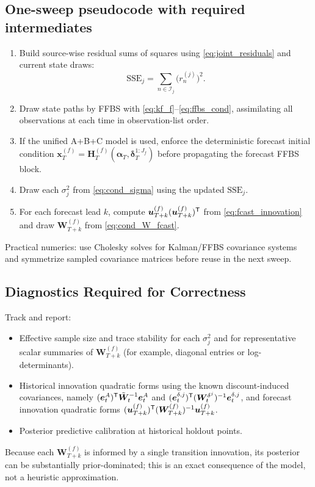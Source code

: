 \subsection{One-sweep pseudocode with required intermediates}
\begin{enumerate}[label=\textbf{P\arabic*:},leftmargin=2.0cm]
\item Build source-wise residual sums of squares using \eqref{eq:joint_residuals}
and current state draws:
\[
\mathrm{SSE}_j=\sum_{n\in\mathcal{I}_j}\big(r_n^{(j)}\big)^2.
\]
\item Draw state paths by FFBS with \eqref{eq:kf_f}--\eqref{eq:ffbs_cond},
assimilating all observations at each time in observation-list order.
\item If the unified A+B+C model is used, enforce the deterministic forecast initial condition
$\bm x_T^{(f)}=\bm H_T^{(f)}(\bm\alpha_T,\bm\delta_T^{1:J_f})$ before propagating the forecast FFBS
block.
\item Draw each $\sigma_j^2$ from \eqref{eq:cond_sigma} using the updated $\mathrm{SSE}_j$.
\item For each forecast lead $k$, compute
$\bm u_{T+k}^{(f)}(\bm u_{T+k}^{(f)})^{\mathsf{T}}$ from \eqref{eq:fcast_innovation}
and draw $\bm W_{T+k}^{(f)}$ from \eqref{eq:cond_W_fcast}.
\end{enumerate}
Practical numerics: use Cholesky solves for Kalman/FFBS covariance systems and symmetrize sampled
covariance matrices before reuse in the next sweep.

\subsection{Diagnostics Required for Correctness}
Track and report:
\begin{itemize}
\item Effective sample size and trace stability for each $\sigma_j^2$ and for representative
      scalar summaries of $\bm W_{T+k}^{(f)}$ (for example, diagonal entries or log-determinants).
\item Historical innovation quadratic forms using the known discount-induced covariances, namely
      $(\bm e_t^A)^{\mathsf{T}}\tilde{\bm W}_t^{-1}\bm e_t^A$ and
      $(\bm e_t^{\delta,j})^{\mathsf{T}}(\bm W_t^{\delta^j})^{-1}\bm e_t^{\delta,j}$, and forecast innovation quadratic forms
      $(\bm u_{T+k}^{(f)})^{\mathsf{T}}(\bm W_{T+k}^{(f)})^{-1}\bm u_{T+k}^{(f)}$.
\item Posterior predictive calibration at historical holdout points.
\end{itemize}
Because each $\bm W_{T+k}^{(f)}$ is informed by a single transition innovation, its posterior can be
substantially prior-dominated; this is an exact consequence of the model, not a heuristic approximation.
